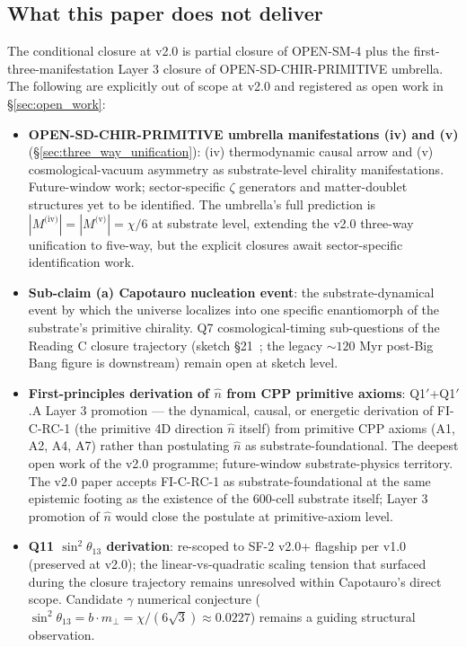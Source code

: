 \documentclass[11pt,letterpaper]{article}
\begin{document}
\subsection{What this paper does not deliver}\label{sec:what_not}

The conditional closure at v2.0 is partial closure of OPEN-SM-4 plus the first-three-manifestation Layer 3 closure of OPEN-SD-CHIR-PRIMITIVE umbrella. The following are explicitly out of scope at v2.0 and registered as open work in \S\ref{sec:open_work}:

\begin{itemize}\setlength\itemsep{0.2em}
    \item \textbf{OPEN-SD-CHIR-PRIMITIVE umbrella manifestations (iv) and (v)} (\S\ref{sec:three_way_unification}): (iv) thermodynamic causal arrow and (v) cosmological-vacuum asymmetry as substrate-level chirality manifestations. Future-window work; sector-specific $\zeta$ generators and matter-doublet structures yet to be identified. The umbrella's full prediction is $|M^{\text{(iv)}}| = |M^{\text{(v)}}| = \chi/6$ at substrate level, extending the v2.0 three-way unification to five-way, but the explicit closures await sector-specific identification work.
    \item \textbf{Sub-claim (a) Capotauro nucleation event}: the substrate-dynamical event by which the universe localizes into one specific enantiomorph of the substrate's primitive chirality. Q7 cosmological-timing sub-questions of the Reading C closure trajectory (sketch \S21~\cite{abshier_capotauro_chiral_mechanism_sketch}; the legacy $\sim 120$ Myr post-Big Bang figure is downstream) remain open at sketch level.
    \item \textbf{First-principles derivation of $\hat{n}$ from CPP primitive axioms}: Q1$'$+Q1$'$.A Layer 3 promotion --- the dynamical, causal, or energetic derivation of FI-C-RC-1 (the primitive 4D direction $\hat{n}$ itself) from primitive CPP axioms (A1, A2, A4, A7) rather than postulating $\hat{n}$ as substrate-foundational. The deepest open work of the v2.0 programme; future-window substrate-physics territory. The v2.0 paper accepts FI-C-RC-1 as substrate-foundational at the same epistemic footing as the existence of the 600-cell substrate itself; Layer 3 promotion of $\hat{n}$ would close the postulate at primitive-axiom level.
    \item \textbf{Q11 $\sin^2\theta_{13}$ derivation}: re-scoped to SF-2 v2.0+ flagship per v1.0 (preserved at v2.0); the linear-vs-quadratic scaling tension that surfaced during the closure trajectory remains unresolved within Capotauro's direct scope. Candidate $\gamma$ numerical conjecture ($\sin^2\theta_{13} = b \cdot m_\perp = \chi/(6\sqrt{3}) \approx 0.0227$) remains a guiding structural observation.

\end{itemize}
\end{document}
